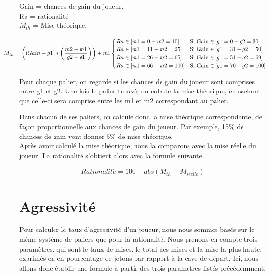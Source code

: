 \documentclass{report}
\begin{document}
\small{
\begin{center}

Gain = chances de gain du joueur,\\
Ra = rationalité\\
$M_{th}$ = Mise théorique.\\

\end{center}
\begin{align*}
	\hspace{-1cm}M_{th} = \left((Gain - g1) * \left(\frac{m2-m1}{g2-g1}\right)\right)+m1
	\begin{cases}
		Ra \in [m1=0 - m2=10] &\text{Si Gain} \in [g1=0 - g2=30]\\
		Ra \in [m1=11 - m2=25] &\text{Si Gain} \in [g1=31 - g2=50]\\
		Ra \in [m1=26 - m2=65] &\text{Si Gain} \in [g1=51 - g2=69]\\
		Ra \in [m1=66 - m2=100] &\text{Si Gain} \in [g1=70 - g2=100]\\
	\end{cases}
\end{align*}
}

Pour chaque palier, on regarde si les chances de gain du joueur sont comprises entre g1 et g2. Une fois le palier trouvé, on calcule la mise théorique, en sachant que celle-ci sera comprise entre les m1 et m2 correspondant au palier. \par
Dans chacun de ses paliers, on calcule donc la mise théorique correspondante, de façon proportionnelle aux chances de gain du joueur. Par exemple, 15\% de chances de gain vont donner 5\% de mise théorique.\\
	
Après avoir calculé la mise théorique, nous la comparons avec la mise réelle du joueur. La rationalité s’obtient alors avec la formule suivante. \par

\begin{align*}
Rationalit\acute{e} = 100-abs(M_{th}-M_{r\acute{e}elle})
\end{align*}



\section{Agressivité}

\hspace{0.5cm}Pour calculer le taux d'agressivité d'un joueur, nous nous sommes basés sur le même système de paliers que pour la rationalité. Nous prenons en compte trois paramètres, qui sont le taux de mises, le total des mises et la mise la plus haute, exprimés en en pourcentage de jetons par rapport à la cave de départ. Ici, nous allons donc établir une formule à partir des trois paramètres listés précédemment.\\
\end{document}
